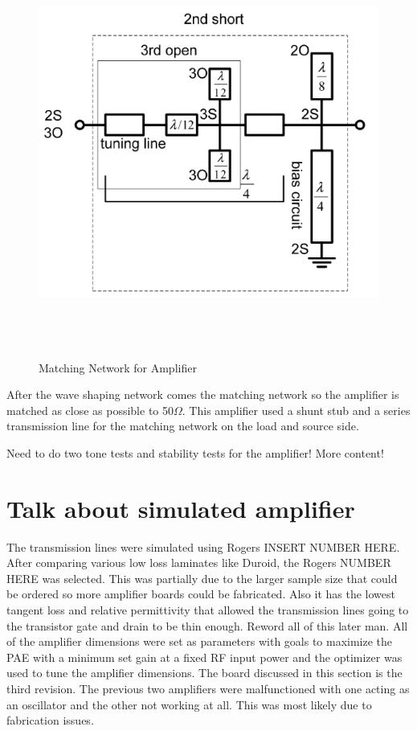 \begin{figure}
  \centering
  \includegraphics[width=5in,height=5in,keepaspectratio]{figures/simulation/matching_network_woo}\\
  \caption{Matching Network for Amplifier} %
  \label{fig:matching_network_woo}
\end{figure}

After the wave shaping network comes the matching network so the amplifier is matched as close as possible to 50$\Omega$. This amplifier used a shunt stub and a series transmission line for the matching network on the load and source side.

Need to do two tone tests and stability tests for the amplifier! More content!

\section{Talk about simulated amplifier}
The transmission lines were simulated using Rogers INSERT NUMBER HERE. After comparing various low loss laminates like Duroid, the Rogers NUMBER HERE was selected. This was partially due to the larger sample size that could be ordered so more amplifier boards could be fabricated. Also it has the lowest tangent loss and relative permittivity that allowed the transmission lines going to the transistor gate and drain to be thin enough. Reword all of this later man. All of the amplifier dimensions were set as parameters with goals to maximize the PAE with a minimum set gain at a fixed RF input power and the optimizer was used to tune the amplifier dimensions. The board discussed in this section is the third revision. The previous two amplifiers were malfunctioned with one acting as an oscillator and the other not working at all. This was most likely due to fabrication issues.

